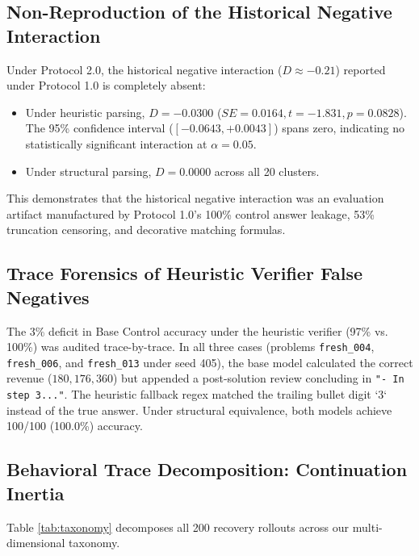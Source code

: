 \documentclass[11pt,letterpaper]{article}
\begin{document}
\subsection{Non-Reproduction of the Historical Negative Interaction}
Under Protocol 2.0, the historical negative interaction ($D \approx -0.21$) reported under Protocol 1.0 is completely absent:
\begin{itemize}
    \item Under heuristic parsing, $D = -0.0300$ ($SE = 0.0164, t = -1.831, p = 0.0828$). The 95\% confidence interval ($[-0.0643, +0.0043]$) spans zero, indicating no statistically significant interaction at $\alpha = 0.05$.
    \item Under structural parsing, $D = 0.0000$ across all 20 clusters.
\end{itemize}
This demonstrates that the historical negative interaction was an evaluation artifact manufactured by Protocol 1.0's 100\% control answer leakage, 53\% truncation censoring, and decorative matching formulas.

\subsection{Trace Forensics of Heuristic Verifier False Negatives}
The 3\% deficit in Base Control accuracy under the heuristic verifier (97\% vs. 100\%) was audited trace-by-trace. In all three cases (problems \texttt{fresh\_004}, \texttt{fresh\_006}, and \texttt{fresh\_013} under seed 405), the base model calculated the correct revenue ($180, 176, 360$) but appended a post-solution review concluding in \texttt{"- In step 3..."}. The heuristic fallback regex matched the trailing bullet digit `3` instead of the true answer. Under structural equivalence, both models achieve 100/100 (100.0\%) accuracy.

\subsection{Behavioral Trace Decomposition: Continuation Inertia}
Table \ref{tab:taxonomy} decomposes all 200 recovery rollouts across our multi-dimensional taxonomy.
\end{document}
